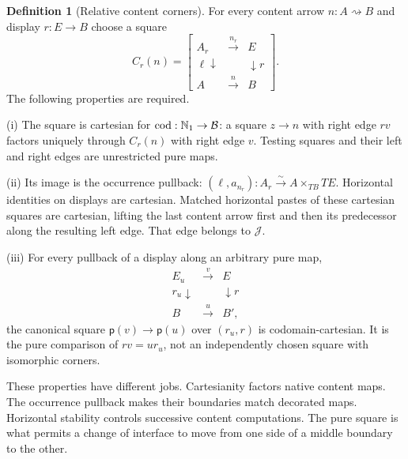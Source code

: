 \documentclass[11pt]{article}
\numberwithin{equation}{section}
\theoremstyle{definition}\newtheorem{definition}[theorem]{Definition}
\newcommand{\B}{\mathcal B}\newcommand{\J}{\mathcal J}
\newcommand{\iso}{\xrightarrow{\sim}}\newcommand{\ea}{e}\newcommand{\un}{\mathbf1}\newcommand{\Tt}{\overline T}
\newcommand{\pure}{\mathsf p}\newcommand{\grade}{\mathsf G}
\begin{document}
\begin{definition}[Relative content corners]\label{def:corners}
For every content arrow $n:A\rightsquigarrow B$ and display $r:E\to B$
choose a square
\begin{equation}\label{eq:corner}
 C_r(n)=\left[
 \begin{array}{ccc}
 A_r&\xrightarrow{n_r}&E\\
 {\scriptstyle\ell}\downarrow&&\downarrow{\scriptstyle r}\\
 A&\xrightarrow{n}&B
 \end{array}\right].
\end{equation}
The following properties are required.

\smallskip\noindent
\textup{(i)} The square is cartesian for $\cod:\N_1\to\B$: a square
$z\to n$ with right edge $rv$ factors uniquely through $C_r(n)$ with
right edge $v$. Testing squares and their left and right edges are
unrestricted pure maps.

\smallskip\noindent
\textup{(ii)} Its image is the occurrence pullback:
$(\ell,a_{n_r}):A_r\iso A\times_{TB}TE$. Horizontal identities on
displays are cartesian. Matched horizontal pastes of these cartesian
squares are cartesian, lifting the last content arrow first and then its
predecessor along the resulting left edge. That edge belongs to $\J$.

\smallskip\noindent
\textup{(iii)} For every pullback of a display along an arbitrary pure map,
\[
 \begin{array}{ccc}E_u&\xrightarrow v&E\\
 {\scriptstyle r_u}\downarrow&&\downarrow{\scriptstyle r}\\
 B&\xrightarrow u&B',\end{array}
\]
the canonical square $\pure(v)\to\pure(u)$ over $(r_u,r)$ is
codomain-cartesian. It is the pure comparison of $rv=ur_u$, not an
independently chosen square with isomorphic corners.
\end{definition}
These properties have different jobs. Cartesianity factors native content
maps. The occurrence pullback makes their boundaries match decorated
maps. Horizontal stability controls successive content computations.
The pure square is what permits a change of interface to move from one
side of a middle boundary to the other.
\end{document}
